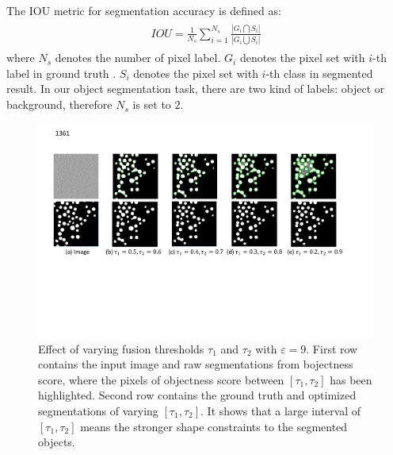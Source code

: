 The IOU metric for segmentation accuracy is defined as:
%
\begin{eqnarray}\label{EqIou}
\begin{aligned}
IOU = \frac{1}{N_s}\sum_{i=1}^{N_s}\frac{|G_i\bigcap S_i|}{|G_i\bigcup S_i|}
\end{aligned}
\end{eqnarray}
%
where $N_s$ denotes the number of pixel label.
$G_i$ denotes the pixel set with $i$-th label in ground truth .
$S_i$ denotes the pixel set with $i$-th class in segmented result.
In our object segmentation task, there are two kind of labels: object or background, therefore $N_s$ is set to $2$.
\begin{figure}
    \begin{center}
        \includegraphics[width=7in]{figures/FigCon.pdf}
    \end{center}
    \caption{Effect of varying fusion thresholds $\tau_1$ and $\tau_2$ with $\varepsilon=9$. First row contains the input image and raw segmentations from bojectness score, where the pixels of objectness score between $[\tau_1,\tau_2]$ has been highlighted. Second row contains the ground truth and optimized segmentations of varying $[\tau_1,\tau_2]$. It shows that a large interval of $[\tau_1,\tau_2]$ means the stronger shape constraints to the segmented objects.}
    \label{FigCon}
\end{figure}


